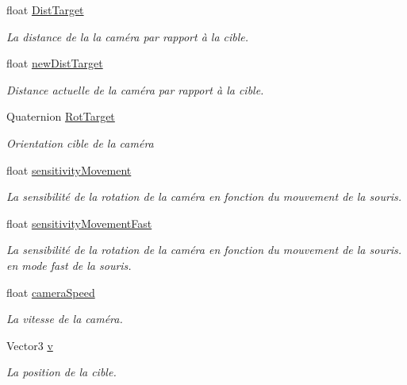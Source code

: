 \begin{DoxyCompactItemize}
float \mbox{\hyperlink{class_camera_control_a05cde63cd5df67764f7932695731a71f}{Dist\+Target}}
\begin{DoxyCompactList}\small\item\em La distance de la la caméra par rapport à la cible. \end{DoxyCompactList}\item 
float \mbox{\hyperlink{class_camera_control_a9d3c95bbc5b16383e99c07b5239ff070}{new\+Dist\+Target}}
\begin{DoxyCompactList}\small\item\em Distance actuelle de la caméra par rapport à la cible. \end{DoxyCompactList}\item 
Quaternion \mbox{\hyperlink{class_camera_control_a0a2bfdf7b029eeb53e96ed5d8c0b84a1}{Rot\+Target}}
\begin{DoxyCompactList}\small\item\em Orientation cible de la caméra \end{DoxyCompactList}\item 
float \mbox{\hyperlink{class_camera_control_ae37f465a1005c089ee7962aaf8aec76e}{sensitivity\+Movement}}
\begin{DoxyCompactList}\small\item\em La sensibilité de la rotation de la caméra en fonction du mouvement de la souris. \end{DoxyCompactList}\item 
float \mbox{\hyperlink{class_camera_control_a16be738f9e3af72fbcf8ab2444c188a7}{sensitivity\+Movement\+Fast}}
\begin{DoxyCompactList}\small\item\em La sensibilité de la rotation de la caméra en fonction du mouvement de la souris. en mode fast de la souris. \end{DoxyCompactList}\item 
float \mbox{\hyperlink{class_camera_control_adcc51409a2ce333ddd86f86ed5acdd41}{camera\+Speed}}
\begin{DoxyCompactList}\small\item\em La vitesse de la caméra. \end{DoxyCompactList}\item 
Vector3 \mbox{\hyperlink{class_camera_control_a691c217272275657d242c27b496964b6}{v}}
\begin{DoxyCompactList}\small\item\em La position de la cible. \end{DoxyCompactList}\item 

\end{DoxyCompactItemize}
